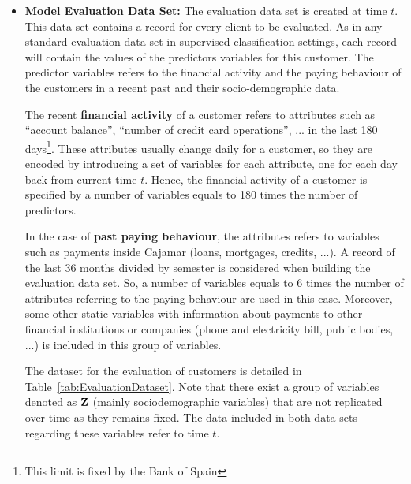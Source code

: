 \begin{itemize}
\item \textbf{Model Evaluation Data Set:} The evaluation data set is created at time $t$. This data set contains a record for every client to be evaluated. As in any standard evaluation data set in supervised classification settings, each record will contain the values of the predictors variables for this customer. The predictor variables refers to the financial activity and the paying behaviour of the customers in a recent past and their socio-demographic data. 

The recent {\bf financial activity} of a customer refers to attributes such as ``account balance'', ``number of credit card operations'', ... in the last 180 days\footnote{This limit is fixed by the Bank of Spain}. These attributes usually change daily for a customer, so they are encoded by introducing a set of variables for each attribute, one for each day back from current time $t$. Hence, the financial activity of a customer is specified by a number of variables equals to 180 times the number of predictors. 

In the case of {\bf past paying behaviour}, the attributes refers to variables such as payments inside Cajamar (loans, mortgages, credits, ...). A record of the last 36 months divided by semester is considered when building the evaluation data set. So, a number of variables equals to $6$ times the number of attributes referring to the paying behaviour are used in this case. Moreover, some other static variables with information about payments to other financial institutions or companies (phone and electricity bill, public bodies, ...) is included in this group of variables.

The dataset for the evaluation of customers is detailed in Table~\ref{tab:EvaluationDataset}. Note that there exist a group of variables denoted as $\mathbf{Z}$ (mainly sociodemographic variables) that are not replicated over time as they remains fixed. The data included in both data sets regarding these variables refer to time $t$.



\end{itemize}
